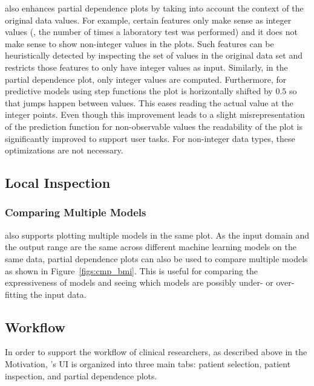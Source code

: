\prospector also enhances partial dependence plots by taking into account the context of the original data values.  For example, certain features only make sense as integer values (\eg, the number of times a laboratory test was performed) and it does not make sense to show non-integer values in the plots.
Such features can be heuristically detected by inspecting the set of values in the original data set and \prospector restricts those features to only have integer values as input.
Similarly, in the partial dependence plot, only integer values are computed.
Furthermore, for predictive models using step functions the plot
is horizontally shifted by $0.5$ so that jumps happen between values.
This eases reading the actual value at the integer points.
Even though this improvement leads to a slight misrepresentation of the prediction function for non-observable values the readability of the plot is significantly improved to support user tasks.
For non-integer data types, these optimizations are not necessary.

\subsection{Local Inspection}


\subsubsection{Comparing Multiple Models}


\prospector also supports plotting multiple models in the same plot.  As the input domain and the output range are the same across different machine learning
models on the same data,  partial dependence plots can also be used to compare multiple
models as shown in Figure~\ref{figs:cmp_bmi}.  This is useful for comparing the expressiveness of models and seeing which models are possibly under- or over-fitting the input data.

\subsection{Workflow}

In order to support the workflow of clinical researchers, as described above in the Motivation, \prospector's UI is organized into three main tabs: patient selection, patient inspection, and partial dependence plots.

